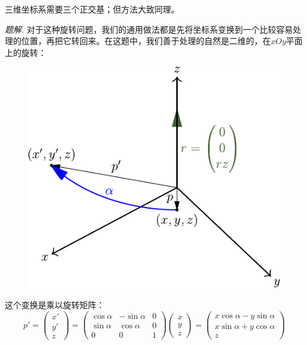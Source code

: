 \documentclass[UTF8,12pt]{ctexart}
\begin{document}
三维坐标系需要三个正交基；但方法大致同理。

\textit{题解.} 对于这种旋转问题，我们的通用做法都是先将坐标系变换到一个比较容易处理的位置，再把它转回来。在这题中，我们善于处理的自然是二维的，在$xOy$平面上的旋转：
\begin{figure}[H]
    \centering
    \includegraphics{Rotation1.pdf}
\end{figure}
这个变换是乘以旋转矩阵：
\[p'=\begin{pmatrix}x'\\y'\\z\end{pmatrix}=\begin{pmatrix}\cos\alpha&-\sin\alpha&0\\\sin\alpha&\cos\alpha&0\\0&0&1\end{pmatrix}\begin{pmatrix}x\\y\\z\end{pmatrix}=\begin{pmatrix}x\cos\alpha-y\sin\alpha\\x\sin\alpha+y\cos\alpha\\z\end{pmatrix}\]
\end{document}
